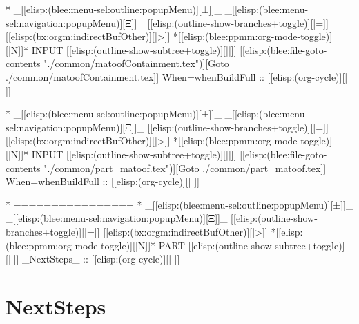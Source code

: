 \begin{whenOrg}
*  _[[elisp:(blee:menu-sel:outline:popupMenu)][±]]_ _[[elisp:(blee:menu-sel:navigation:popupMenu)][Ξ]]_ [[elisp:(outline-show-branches+toggle)][|=]] [[elisp:(bx:orgm:indirectBufOther)][|>]] *[[elisp:(blee:ppmm:org-mode-toggle)][|N]]*  INPUT      [[elisp:(outline-show-subtree+toggle)][||]]   [[elisp:(blee:file-goto-contents "./common/matoofContainment.tex")][Goto ./common/matoofContainment.tex]] When=whenBuildFull ::  [[elisp:(org-cycle)][| ]]
\end{whenOrg}
\begin{whenBuildFull}

\end{whenBuildFull}


\begin{whenOrg}
*  _[[elisp:(blee:menu-sel:outline:popupMenu)][±]]_ _[[elisp:(blee:menu-sel:navigation:popupMenu)][Ξ]]_ [[elisp:(outline-show-branches+toggle)][|=]] [[elisp:(bx:orgm:indirectBufOther)][|>]] *[[elisp:(blee:ppmm:org-mode-toggle)][|N]]*  INPUT      [[elisp:(outline-show-subtree+toggle)][||]]   [[elisp:(blee:file-goto-contents "./common/part_matoof.tex")][Goto ./common/part_matoof.tex]] When=whenBuildFull ::  [[elisp:(org-cycle)][| ]]
\end{whenOrg}
\begin{whenBuildFull}

\end{whenBuildFull}


\begin{whenOrg}
*      ================
*  _[[elisp:(blee:menu-sel:outline:popupMenu)][±]]_ _[[elisp:(blee:menu-sel:navigation:popupMenu)][Ξ]]_ [[elisp:(outline-show-branches+toggle)][|=]] [[elisp:(bx:orgm:indirectBufOther)][|>]] *[[elisp:(blee:ppmm:org-mode-toggle)][|N]]*  PART       [[elisp:(outline-show-subtree+toggle)][||]]   _NextSteps_ ::  [[elisp:(org-cycle)][| ]]
\end{whenOrg}

\newpage
\part{NextSteps}


